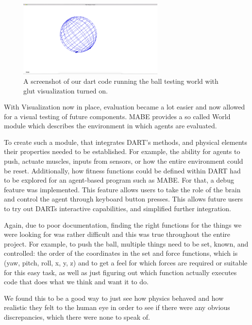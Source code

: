 \documentclass[12pt,oneside,listof=totoc,paper=a4,headings=small]{scrbook}
\begin{document}
\begin{figure}[h!]
\centering
\includegraphics[width=0.65\textwidth,height=0.65\textheight,keepaspectratio]{images/ball_example.png}
\caption{A screenshot of our dart code running the ball testing world with glut visualization turned on.}
\label{fig:ball_example}
\end{figure}

With Visualization now in place, evaluation became a lot easier and now allowed for a visual testing of future components. MABE provides a so called World module which describes the environment in which agents are evaluated.

To create such a module, that integrates DART's methods, and physical elements their properties needed to be established. For example, the ability for agents to push, actuate muscles, inputs from sensors, or how the entire environment could be reset. 
Additionally, how fitness functions could be defined within DART had to be explored for an agent-based program such as MABE. For that, a debug feature was implemented. This feature allows users to take the role of the brain and control the agent through keyboard button presses. This allows future users to try out DARTs interactive capabilities, and simplified further integration.

Again, due to poor documentation, finding the right functions for the things we were looking for was rather difficult and this was true throughout the entire project. For example, to push the ball, multiple things need to be set, known, and controlled: the order of the coordinates in the set and force functions, which is (yaw, pitch, roll, x, y, z) and to get a feel for which forces are required or suitable for this easy task, as well as just figuring out which function actually executes code that does what we think and want it to do. 

We found this to be a good way to just see how physics behaved and how realistic they felt to the human eye in order to see if there were any obvious discrepancies, which there were none to speak of.
\end{document}

